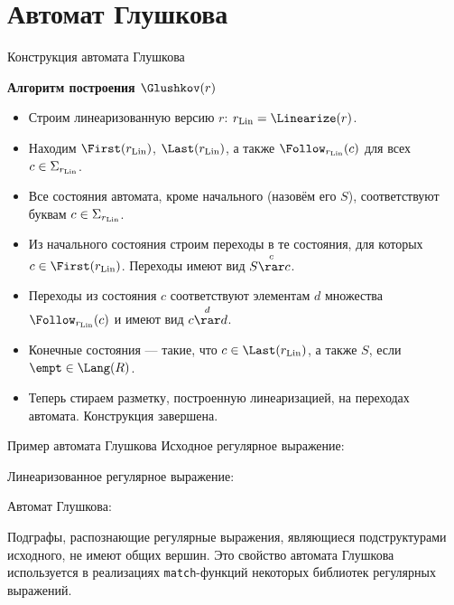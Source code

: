 \section{Автомат Глушкова}
\begin{frame}{Конструкция автомата Глушкова}
  \begin{block}{\bf Алгоритм построения $\Glushkov(r)$}
    \begin{itemize}
      \item Строим линеаризованную версию $r$: $r_{\rm Lin} =\Linearize(r)$.
      \item Находим $\First(r_{\rm Lin})$, $\Last(r_{\rm Lin})$, а также $\Follow_{r_{\rm Lin}}(c)$ для всех $c\in\Sigma_{r_{\rm Lin}}$.
      \item Все состояния автомата, кроме начального (назовём его $S$), соответствуют буквам $c\in\Sigma_{r_{\rm Lin}}$.
      \item Из начального состояния строим переходы в те состояния, для которых $c\in\First(r_{\rm Lin})$. Переходы имеют вид $S\overset{c}{\rar}{c}$.
      \item Переходы из состояния $c$ соответствуют элементам $d$ множества $\Follow_{r_{\rm Lin}}(c)$ и имеют вид $c\overset{d}{\rar}{d}$.
      \item Конечные состояния --- такие, что $c\in\Last(r_{\rm Lin})$, а также $S$, если $\empt\in\Lang(R)$.
      \item Теперь стираем разметку, построенную линеаризацией, на переходах автомата. Конструкция завершена.
    \end{itemize}
  \end{block} %
\end{frame}
\begin{frame}{Пример автомата Глушкова}
  Исходное регулярное выражение:


  Линеаризованное регулярное выражение:

  Автомат Глушкова:

  Подграфы, распознающие регулярные выражения, являющиеся подструктурами исходного, не имеют общих вершин. Это свойство автомата Глушкова используется в реализациях \texttt{match}-функций некоторых библиотек регулярных выражений. %
\end{frame}

